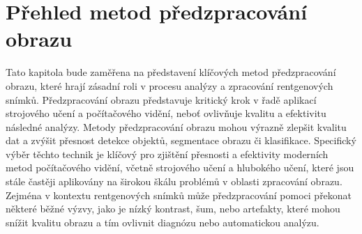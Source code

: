 \documentclass[male,czech,api_ing]{thesis}
\begin{document}
       
       
       
       
       
        
	
	


\chapter{Přehled metod předzpracování obrazu}
Tato kapitola bude zaměřena na představení klíčových metod předzpracování obrazu, které hrají zásadní roli v procesu analýzy a zpracování rentgenových snímků. Předzpracování obrazu představuje kritický krok v řadě aplikací strojového učení a počítačového vidění, neboť ovlivňuje kvalitu a efektivitu následné analýzy. Metody předzpracování obrazu mohou výrazně zlepšit kvalitu dat a zvýšit přesnost detekce objektů, segmentace obrazu či klasifikace. Specifický výběr těchto technik je klíčový pro zjištění přesnosti a efektivity moderních metod počítačového vidění, včetně strojového učení a hlubokého učení, které jsou stále častěji aplikovány na širokou škálu problémů v oblasti zpracování obrazu. Zejména v kontextu rentgenových snímků může předzpracování pomoci překonat některé běžné výzvy, jako je nízký kontrast, šum, nebo artefakty, které mohou snížit kvalitu obrazu a tím ovlivnit diagnózu nebo automatickou analýzu.\cite{ImportanceOfImageProcessing}
\end{document}
